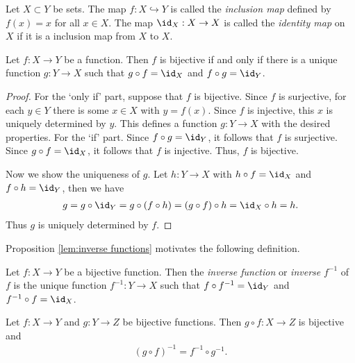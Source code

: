 \begin{example}
    Let $X \subset Y$ be sets. The map $f : X \hookrightarrow Y$ is called the \emph{inclusion map} defined by $f(x) = x$ for all $x \in X$. The map $\id_X : X \to X$ is called the \emph{identity map} on $X$ if it is a inclusion map from $X$ to $X$.
\end{example}

\begin{proposition}\label{lem:inverse functions}
    Let $f : X \to Y$ be a function. Then $f$ is bijective if and only if there is a unique function $g : Y \to X$ such that $g \circ f = \id_X$ and $f \circ g = \id_Y$.
\end{proposition}

\begin{proof}
    For the `only if' part, suppose that $f$ is bijective. Since $f$ is surjective, for each $y \in Y$ there is some $x \in X$ with $y = f(x)$. Since $f$ is injective, this $x$ is uniquely determined by $y$. This defines a function $g : Y \to X$ with the desired properties. For the `if' part. Since $f \circ g = \id_Y$, it follows that $f$ is surjective. Since $g \circ f = \id_X$, it follows that $f$ is injective. Thus, $f$ is bijective.

    Now we show the uniqueness of $g$. Let $h : Y \to X$ with $h \circ f = \id_X$ and $f \circ h = \id_Y$, then we have
        \begin{align*}
            g
            = g \circ \id_Y
            = g \circ (f \circ h)
            = (g \circ f) \circ h
            = \id_X \circ h
            = h.
        \end{align*}
    Thus $g$ is uniquely determined by $f$.
\end{proof}

Proposition \ref{lem:inverse functions} motivates the following definition.

\begin{definition}
    Let $f : X \to Y$ be a bijective function. Then the \emph{inverse function} or \emph{inverse} $f^{-1}$ of $f$ is the unique function $f^{-1} : Y \to X$ such that $f \circ f^{-1} = \id_Y$ and $f^{-1} \circ f = \id_X$.
\end{definition}

\begin{proposition}
    Let $f : X \to Y$ and $g : Y \to Z$ be bijective functions. Then $g \circ f : X \to Z$ is bijective and
    \begin{align*}
        (g \circ f)^{-1} = f^{-1} \circ g^{-1}.
    \end{align*}
\end{proposition}

